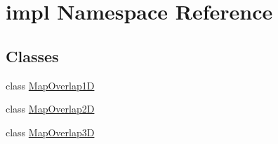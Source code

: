 \hypertarget{namespaceimpl}{\section{impl Namespace Reference}
\label{namespaceimpl}
}
\subsection*{Classes}
\begin{DoxyCompactItemize}
\item 
class \hyperlink{classimpl_1_1MapOverlap1D}{Map\-Overlap1\-D}
\item 
class \hyperlink{classimpl_1_1MapOverlap2D}{Map\-Overlap2\-D}
\item 
class \hyperlink{classimpl_1_1MapOverlap3D}{Map\-Overlap3\-D}
\end{DoxyCompactItemize}

